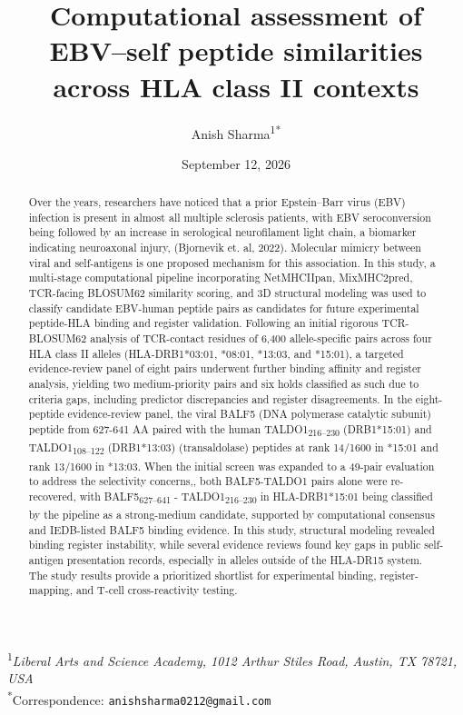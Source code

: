 \documentclass[11pt]{article}
\title{Computational assessment of EBV--self peptide similarities across HLA class II contexts}
\author{Anish Sharma\textsuperscript{1*}}
\date{September 12, 2026}
\begin{document}
\maketitle
\begin{center}
\small \textsuperscript{1}\textit{Liberal Arts and Science Academy, 1012 Arthur Stiles Road, Austin, TX 78721, USA}\\
\small \textsuperscript{*}Correspondence: \texttt{anishsharma0212@gmail.com}
\end{center}

\begin{abstract}
Over the years, researchers have noticed that a prior Epstein--Barr virus (EBV) infection is present in almost all multiple sclerosis patients, with EBV seroconversion being followed by an increase in serological neurofilament light chain, a biomarker indicating neuroaxonal injury, (Bjornevik et. al, 2022). Molecular mimicry between viral and self-antigens is one proposed mechanism for this association. In this study, a multi-stage computational pipeline incorporating NetMHCIIpan, MixMHC2pred, TCR-facing BLOSUM62 similarity scoring, and 3D structural modeling was used to classify candidate EBV-human peptide pairs as candidates for future experimental peptide-HLA binding and register validation. Following an initial rigorous TCR-BLOSUM62 analysis of TCR-contact residues of 6,400 allele-specific pairs across four HLA class II alleles (HLA-DRB1*03:01, *08:01, *13:03, and *15:01), a targeted evidence-review panel of eight pairs underwent further binding affinity and register analysis, yielding two medium-priority pairs and six holds classified as such due to criteria gaps, including predictor discrepancies and register disagreements. In the eight-peptide evidence-review panel, the viral BALF5 (DNA polymerase catalytic subunit) peptide from 627-641 AA paired with the human TALDO1\textsubscript{216--230} (DRB1*15:01) and TALDO1\textsubscript{108--122} (DRB1*13:03) (transaldolase) peptides at rank 14/1600 in *15:01 and rank 13/1600 in *13:03. When the initial screen was expanded to a 49-pair evaluation to address the selectivity concerns,, both BALF5-TALDO1 pairs alone were re-recovered, with BALF5\textsubscript{627--641} - TALDO1\textsubscript{216--230} in HLA-DRB1*15:01 being classified by the pipeline as a strong-medium candidate, supported by computational consensus and IEDB-listed BALF5 binding evidence. In this study, structural modeling revealed binding register instability, while several evidence reviews found key gaps in public self-antigen presentation records, especially in alleles outside of the HLA-DR15 system. The study results provide a prioritized shortlist for experimental binding, register-mapping, and T-cell cross-reactivity testing.
\end{abstract}
\end{document}
